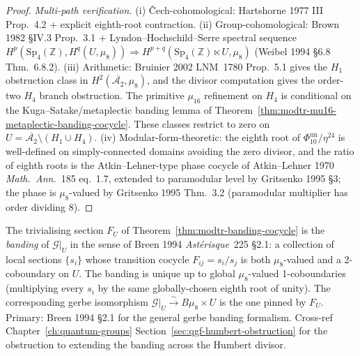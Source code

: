 \begin{proof}
\emph{Multi-path verification.}
(i) \v{C}ech-cohomological: Hartshorne 1977 III Prop.~4.2 +
 explicit eighth-root contraction.
(ii) Group-cohomological: Brown 1982 \S IV.3 Prop.~3.1 +
 Lyndon--Hochschild--Serre spectral sequence
 $H^p(\mathrm{Sp}_4(\mathbb Z),H^q(U,\mu_8))\Rightarrow
 H^{p+q}(\mathrm{Sp}_4(\mathbb Z)\ltimes U,\mu_8)$
 (Weibel 1994 \S6.8 Thm.~6.8.2).
(iii) Arithmetic: Bruinier 2002 LNM~1780 Prop.~5.1 gives the
 $H_1$ obstruction class in $H^2(\overline{\mathcal A_2},\mu_8)$, and the
 divisor computation gives the order-two $H_4$ branch obstruction. The
 primitive $\mu_{16}$ refinement on $H_4$ is conditional on the
 Kuga--Satake/metaplectic banding lemma of
 Theorem~\ref{thm:modtr-mu16-metaplectic-banding-cocycle}. These classes
 restrict to zero on
 $U = \overline{\mathcal A_2}\setminus(H_1\cup H_4)$.
(iv) Modular-form-theoretic: the eighth root of
 $\Phi_{10}^{\mathrm{un}}/\eta^{24}$ is well-defined on simply-connected domains
 avoiding the zero divisor, and the ratio of eighth roots is the
 Atkin--Lehner-type phase cocycle of Atkin--Lehner 1970
 \emph{Math.\ Ann.}~185 eq.~1.7, extended to paramodular level by
 Gritsenko 1995 \S3; the phase is $\mu_8$-valued by Gritsenko 1995
 Thm.~3.2 (paramodular multiplier has order dividing $8$).
\end{proof}

\begin{remark}
\label{rem:modtr-cocycle-vs-banding}
The trivialising section $F_U$ of
Theorem~\ref{thm:modtr-banding-cocycle} is the \emph{banding}
of $\mathcal G|_U$ in the sense of Breen 1994 \emph{Ast\'erisque}~225
\S2.1: a collection of local sections $\{s_i\}$ whose transition
cocycle $F_{ij} = s_i/s_j$ is both $\mu_8$-valued and a 2-coboundary
on $U$. The banding is unique up to global $\mu_8$-valued
1-coboundaries (multiplying every $s_i$ by the same globally-chosen
eighth root of unity). The corresponding gerbe isomorphism
$\mathcal G|_U \xrightarrow{\sim} B\mu_8\times U$ is the one pinned by
$F_U$. Primary: Breen 1994 \S2.1 for the general gerbe banding
formalism. Cross-ref Chapter~\ref{ch:quantum-groups}
Section~\ref{sec:qgf-humbert-obstruction} for the obstruction
to extending the banding across the Humbert divisor.
\end{remark}

